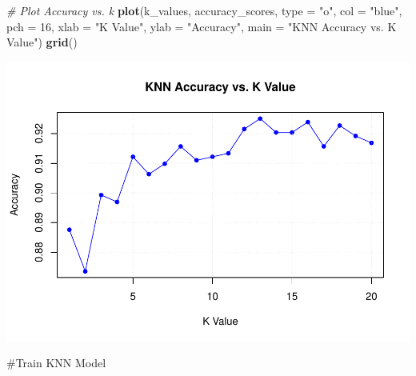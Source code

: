 \documentclass[
]{article}
\newenvironment{Shaded}{\begin{snugshade}}{\end{snugshade}}
\newcommand{\AttributeTok}[1]{\textcolor[rgb]{0.13,0.29,0.53}{#1}}
\newcommand{\CommentTok}[1]{\textcolor[rgb]{0.56,0.35,0.01}{\textit{#1}}}
\newcommand{\DecValTok}[1]{\textcolor[rgb]{0.00,0.00,0.81}{#1}}
\newcommand{\FunctionTok}[1]{\textcolor[rgb]{0.13,0.29,0.53}{\textbf{#1}}}
\newcommand{\NormalTok}[1]{#1}
\newcommand{\StringTok}[1]{\textcolor[rgb]{0.31,0.60,0.02}{#1}}
\begin{document}
\begin{Shaded}
\begin{Highlighting}[]
\CommentTok{\# Plot Accuracy vs. k}
\FunctionTok{plot}\NormalTok{(k\_values, accuracy\_scores, }\AttributeTok{type =} \StringTok{"o"}\NormalTok{, }\AttributeTok{col =} \StringTok{"blue"}\NormalTok{, }\AttributeTok{pch =} \DecValTok{16}\NormalTok{, }\AttributeTok{xlab =} \StringTok{"K Value"}\NormalTok{, }\AttributeTok{ylab =} \StringTok{"Accuracy"}\NormalTok{,}
     \AttributeTok{main =} \StringTok{"KNN Accuracy vs. K Value"}\NormalTok{)}
\FunctionTok{grid}\NormalTok{()}
\end{Highlighting}
\end{Shaded}

\includegraphics{Loan_approval_files/figure-latex/unnamed-chunk-30-1.pdf}

\#Train KNN Model
\end{document}
